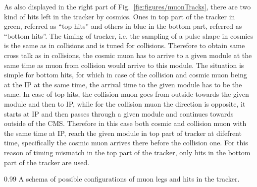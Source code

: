 As also displayed in the right part of Fig.~\ref{fig:figures/muonTracks}, there are two kind of hits left in the tracker by cosmics. Ones in top part of the tracker in green, referred as ``top hits'' and others in blue in the bottom part, referred as ``bottom hits''. The timing of tracker, i.e. the sampling of a pulse shape in cosmics is the same as in collisions and is tuned for collisions. Therefore to obtain same cross talk as in collisions, the cosmic muon has to arrive to a given module at the same time as muon from collision would arrive to this module. The situation is simple for bottom hits, for which in case of the collision and cosmic muon being at the IP at the same time, the arrival time to the given module has to be the same. In case of top hits, the collision muon goes from outside towards the given module and then to IP, while for the collision muon the direction is opposite, it starts at IP and then passes through a given module and continues towards outside of the CMS. Therefore in this case both cosmic and collision muon with the same time at IP, reach the given module in top part of tracker at difefrent time, specifically the cosmic muon arrives there before the collision one. For this reason of timing mismatch in the top part of the tracker, only hits in the bottom part of the tracker are used.

                 {0.99}       %
                 { A schema of possible configurations of muon legs and hits in the tracker. }


